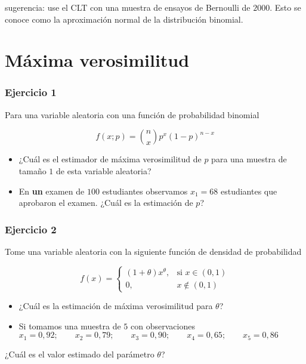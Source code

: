 \documentclass[
]{book}
\begin{document}
sugerencia: use el CLT con una muestra de ensayos de Bernoulli de \(2000\). Esto se conoce como la aproximación normal de la distribución binomial.

\hypertarget{muxe1xima-verosimilitud}{%
\section{Máxima verosimilitud}\label{muxe1xima-verosimilitud}}

\hypertarget{ejercicio-1-7}{%
\subsubsection{Ejercicio 1}\label{ejercicio-1-7}}

Para una variable aleatoria con una función de probabilidad binomial

\[f(x; p)=\binom n x p^x(1-p)^{n-x}\]

\begin{itemize}
\item
  ¿Cuál es el estimador de máxima verosimilitud de \(p\) para una muestra de tamaño \(1\) de esta variable aleatoria?
\item
  En \textbf{un} examen de \(100\) estudiantes observamos \(x_1=68\) estudiantes que aprobaron el examen. ¿Cuál es la estimación de \(p\)?
\end{itemize}

\hypertarget{ejercicio-2-7}{%
\subsubsection{Ejercicio 2}\label{ejercicio-2-7}}

Tome una variable aleatoria con la siguiente función de densidad de probabilidad

\[
f(x)=
\begin{cases}
    (1+\theta)x^\theta,& \text{si } x\in (0,1)\\
    0,&  x\notin (0,1)
\end{cases}
\]

\begin{itemize}
\item
  ¿Cuál es la estimación de máxima verosimilitud para \(\theta\)?
\item
  Si tomamos una muestra de \(5\) con observaciones
  \(x_1 = 0,92; \qquad x_2 = 0,79; \qquad x_3 = 0,90; \qquad x_4 = 0,65; \qquad x_5 = 0,86\)
\end{itemize}

¿Cuál es el valor estimado del parámetro \(\theta\)?
\end{document}
